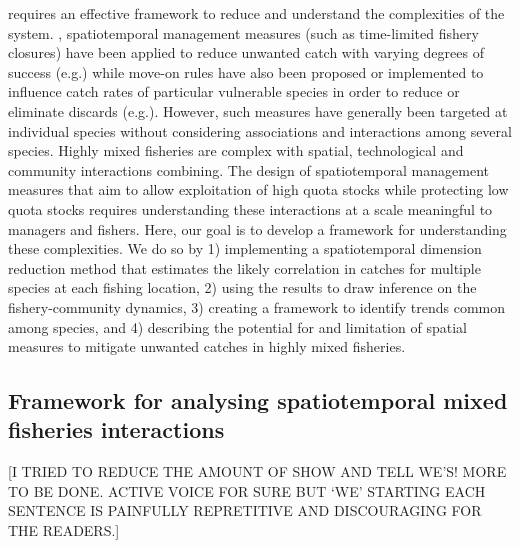 \documentclass[fleqn,10pt]{wlscirep}
\begin{document}
\begin{linenumbers}
 requires an
effective framework to reduce and understand the complexities of the system.
, spatiotemporal management measures (such as
time-limited fishery closures) have been applied to reduce unwanted catch with
varying degrees of success (e.g.\cite{Needle2011, Holmes2011, Beare2010,
	Dinmore2003}) while move-on rules have also been proposed or
implemented to influence catch rates of particular vulnerable species in order
to reduce or eliminate discards (e.g.\cite{Gardner2008, Dunn2011, Dunn2014a}).
However, such measures have generally been targeted at individual species
without considering associations and interactions among several species. Highly
mixed fisheries are complex with spatial, technological and community
interactions combining. The design of spatiotemporal management measures that
aim to allow exploitation of high quota stocks while protecting low quota
stocks requires understanding these interactions at a scale meaningful to
managers and fishers. Here, our goal is to develop a framework for
understanding these complexities. We do so by 1) implementing a spatiotemporal
dimension reduction method that estimates the likely correlation in catches for
multiple species at each fishing location, 2) using the results to draw
inference on the fishery-community dynamics, 3) creating a framework to
identify trends common among species, and 4) describing the potential for and
limitation of spatial measures to mitigate unwanted catches in highly mixed
fisheries.\\

\subsection*{Framework for analysing spatiotemporal mixed fisheries
	interactions \\}
[I TRIED TO REDUCE THE AMOUNT OF SHOW AND TELL WE'S! MORE TO BE DONE. ACTIVE VOICE FOR SURE BUT `WE' STARTING EACH SENTENCE IS PAINFULLY REPRETITIVE AND DISCOURAGING FOR THE READERS.]\\


\end{linenumbers}
\end{document}
